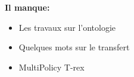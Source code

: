 \documentclass[letterpaper, 10 pt, conference]{ieeeconf}  %
\begin{document}




\textbf{Il manque:} 
\begin{itemize}
  \item Les travaux sur l'ontologie
  \item Quelques mots sur le transfert
  \item MultiPolicy T-rex
\end{itemize}
\end{document}
